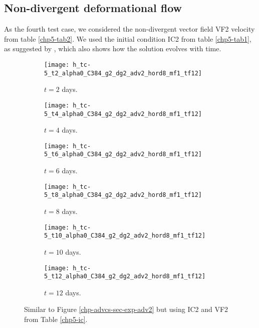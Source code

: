 \subsection{Non-divergent deformational flow}
As the fourth test case, we considered the non-divergent vector field VF2 velocity from table \ref{chp5-tab2}. 
We used the initial condition IC2 from table \ref{chp5-tab1}, as suggested by \citet{nair:2010}, which also shows how the solution evolves with time. 
\begin{figure}[!htb]
	\centering
	\begin{subfigure}{0.45\textwidth}
		\centering
		\texttt{[image: h\_tc-5\_t2\_alpha0\_C384\_g2\_dg2\_adv2\_hord8\_mf1\_tf12]}
		\caption{$t=2$ days.\label{chp-advcs-sec-exp-adv3-a}}
	\end{subfigure}
	\begin{subfigure}{0.45\textwidth}
		\centering
		\texttt{[image: h\_tc-5\_t4\_alpha0\_C384\_g2\_dg2\_adv2\_hord8\_mf1\_tf12]}
		\caption{$t=4$ days.\label{chp-advcs-sec-exp-adv3-b}}
	\end{subfigure}

	\begin{subfigure}{0.45\textwidth}
		\centering
		\texttt{[image: h\_tc-5\_t6\_alpha0\_C384\_g2\_dg2\_adv2\_hord8\_mf1\_tf12]}
		\caption{$t=6$ days.\label{chp-advcs-sec-exp-adv3-c}}
	\end{subfigure}
	\begin{subfigure}{0.45\textwidth}
		\centering
		\texttt{[image: h\_tc-5\_t8\_alpha0\_C384\_g2\_dg2\_adv2\_hord8\_mf1\_tf12]}
		\caption{$t=8$ days.\label{chp-advcs-sec-exp-adv3-d}}
	\end{subfigure}

	\begin{subfigure}{0.45\textwidth}
		\centering
		\texttt{[image: h\_tc-5\_t10\_alpha0\_C384\_g2\_dg2\_adv2\_hord8\_mf1\_tf12]}
		\caption{$t=10$ days.\label{chp-advcs-sec-exp-adv3-e}}
	\end{subfigure}
	\begin{subfigure}{0.45\textwidth}
		\centering
		\texttt{[image: h\_tc-5\_t12\_alpha0\_C384\_g2\_dg2\_adv2\_hord8\_mf1\_tf12]}
		\caption{$t=12$ days.\label{chp-advcs-sec-exp-adv3-f}}
	\end{subfigure}
	\caption{Similar to Figure \ref{chp-advcs-sec-exp-adv2} but using IC2 and VF2 from Table \ref{chp5-ic}.\label{chp-advcs-sec-exp-adv3}}
\end{figure}

